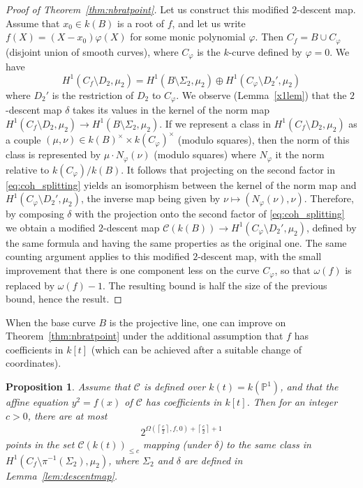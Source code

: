 \documentclass[11pt]{article}
\theoremstyle{plain}
\newtheorem{proposition}[theorem]{Proposition}
\theoremstyle{definition}
\newcommand{\PP}{\mathbb{P}}
\begin{document}
\begin{proof}[Proof of Theorem~\ref{thm:nbratpoint}]
Let us construct this modified $2$-descent map. Assume that $x_0\in k(B)$ is a root of $f$, and let us write $f(X)=(X-x_0)\varphi(X)$ for some monic polynomial $\varphi$. Then  $C_f=B \cup C_\varphi$ (disjoint union of smooth curves), where $C_\varphi$ is the $k$-curve defined by $\varphi=0$. We have
\begin{equation}
\label{eq:coh_splitting}
H^1(C_f\setminus D_2,\mu_2) = H^1(B\setminus \Sigma_2,\mu_2) \oplus H^1(C_\varphi\setminus D_2',\mu_2)
\end{equation}
where $D_2'$ is the restriction of $D_2$ to $C_\varphi$. We observe (Lemma~\ref{x1lem}) that the $2$-descent map $\delta$ takes its values in the kernel of the norm map $H^1(C_f\setminus D_2,\mu_2) \to H^1(B\setminus \Sigma_2,\mu_2)$. If we represent a class in $H^1(C_f\setminus D_2,\mu_2)$ as a couple $(\mu,\nu)\in k(B)^\times \times k(C_\varphi)^\times$ (modulo squares), then the norm of this class is represented by $\mu\cdot N_\varphi(\nu)$ (modulo squares) where $N_\varphi$ it the norm relative to $k(C_\varphi)/k(B)$. It follows that projecting on the second factor in \eqref{eq:coh_splitting} yields an isomorphism between the kernel of the norm map and $H^1(C_\varphi\setminus D_2',\mu_2)$, the inverse map being given by $\nu\mapsto (N_\varphi(\nu),\nu)$. Therefore, by composing $\delta$ with the projection onto the second factor of \eqref{eq:coh_splitting} we obtain a modified $2$-descent map $\mathcal{C}(k(B))\to H^1(C_\varphi\setminus D_2',\mu_2)$, defined by the same formula and having the same properties as the original one. The same counting argument applies to this modified $2$-descent map, with the small improvement that there is one component less on the curve $C_\varphi$, so that $\omega(f)$ is replaced by $\omega(f)-1$. The resulting bound is half the size of the previous bound, hence the result.
\end{proof}



When the base curve $B$ is the projective line, one can improve on Theorem~\ref{thm:nbratpoint} under the additional assumption that $f$ has coefficients in $k[t]$ (which can be achieved after a suitable change of coordinates).

\begin{proposition}
\label{prop:P1nbratpoint}
Assume that $\mathcal{C}$ is defined over $k(t)=k(\PP^1)$, and that the affine equation $y^2=f(x)$ of $\mathcal{C}$ has coefficients in $k[t]$. Then for an integer $c>0$, there are at most
\begin{align*}
2^{\Omega\left(\left\lceil\frac{c}{2}\right\rceil,f,0\right) +\left\lceil\frac{c}{2}\right\rceil+1}
\end{align*}
points in the set $\mathcal{C}(k(t))_{\leq c}$ mapping (under $\delta$) to the same class in $H^1(C_f\setminus \pi^{-1}(\Sigma_2),\mu_2)$, where $\Sigma_2$ and $\delta$ are defined in Lemma~\ref{lem:descentmap}.
\end{proposition}
\end{document}
